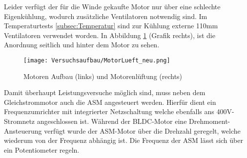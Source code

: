 Leider verfügt der für die Winde gekaufte Motor nur über eine schlechte Eigenkühlung, wodurch zusätzliche Ventilatoren notwendig sind. Im Temperaturtests \ref{subsec:Temperatur} sind zur Kühlung externe 110mm Ventilatoren verwendet worden. In Abbildung \ref{fig:MotorenLueftung} (Grafik rechts), ist die Anordnung seitlich und hinter dem Motor zu sehen.
\begin{figure}[H]
	\begin{center}
		\texttt{[image: Versuchsaufbau/MotorLueft\_neu.png]}
		\caption[Motoren Aufbau und Motorenlüftung]{Motoren Aufbau (links) und Motorenlüftung (rechts)}
		\label{fig:MotorenLueftung}
	\end{center}
\end{figure}

Damit überhaupt Leistungsversuche möglich sind, muss neben dem Gleichstrommotor auch die ASM angesteuert werden. Hierfür dient ein Frequenzumrichter mit integrierter Netzschaltung welche ebenfalls ans 400V-Stromnetz angeschlossen ist. Während der BLDC-Motor eine Drehmoment-Ansteuerung verfügt wurde der ASM-Motor über die Drehzahl geregelt, welche wiederum von der Frequenz abhängig ist. Die Frequenz der ASM lässt sich über ein Potentiometer regeln.